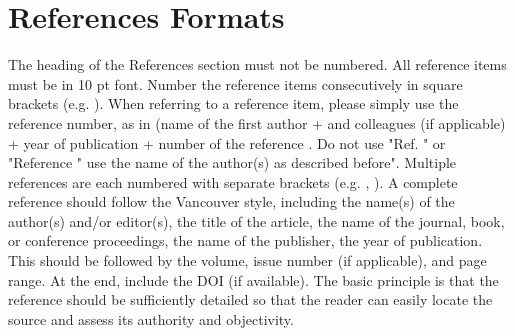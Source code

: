 \documentclass{siintec}
\begin{document}
\section{References Formats}
The heading of the References section must not be numbered. All reference items must be in 10 pt font. Number the reference items consecutively in square brackets (e.g. \cite{fogg2003}). When referring to a reference item, please simply use the reference number, as in (name of the first author + and colleagues (if applicable) + year of publication + number of the reference \cite{hirsh2002}.  Do not use "Ref. \cite{eckes2000}" or "Reference \cite{eckes2000}" use the name of the author(s) as described before".  Multiple references are each numbered with separate brackets (e.g. \cite{fogg2003}, \cite{hirsh2002,eckes2000}).
A complete reference should follow the Vancouver style, including the name(s) of the author(s) and/or editor(s), the title of the article, the name of the journal, book, or conference proceedings, the name of the publisher, the year of publication. This should be followed by the volume, issue number (if applicable), and page range. At the end, include the DOI (if available).
The basic principle is that the reference should be sufficiently detailed so that the reader can easily locate the source and assess its authority and objectivity.
\end{document}
